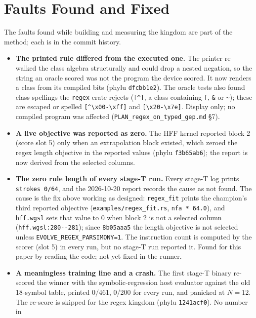 \documentclass[sigconf,nonacm]{acmart}
\newcommand{\rx}{\lstinline[style=mono]}
\newcommand{\src}[1]{{\small\nolinkurl{#1}}}
\begin{document}
\section{Faults Found and Fixed}
\label{sec:faults}

The faults found while building and measuring the kingdom are part of the
method; each is in the commit history.

\begin{itemize}
\item \textbf{The printed rule differed from the executed one.} The printer
re-walked the class algebra structurally and could drop a nested negation, so the
string an oracle scored was not the program the device scored. It now renders a
class from its compiled bits (phylu \texttt{dfcbb1e2}). The oracle tests also
found class spellings the \texttt{regex} crate rejects (\rx![^]!, a class
containing \rx![!, \rx!&! or \rx!~!); these are escaped or spelled
\rx![^\x00-\xff]! and \rx![\x20-\x7e]!. Display only; no compiled program was
affected (\src{PLAN_regex_on_typed_gep.md} \S7).
\item \textbf{A live objective was reported as zero.} The HFF kernel reported
block 2 (score slot 5) only when an extrapolation block existed, which zeroed the
regex length objective in the reported values (phylu \texttt{f3b65ab6}); the
report is now derived from the selected columns.
\item \textbf{The zero rule length of every stage-T run.} Every stage-T log prints
\texttt{strokes 0/64}, and the 2026-10-20 report records the cause as not found.
The cause is the fix above working as designed: \src{regex_fit} prints the
champion's third reported objective (\src{examples/regex_fit.rs},
\texttt{nfa * 64.0}), and \texttt{hff.wgsl} sets that value to 0 when block 2 is
not a selected column (\src{hff.wgsl:280--281}); since \texttt{8b05aaa5} the
length objective is not selected unless \src{EVOLVE_REGEX_PARSIMONY=1}. The
instruction count is computed by the scorer (slot 5) in every run, but no stage-T
run reported it. Found for this paper by reading the code; not yet fixed in the
runner.
\item \textbf{A meaningless training line and a crash.} The first stage-T binary
re-scored the winner with the symbolic-regression host evaluator against the old
18-symbol table, printed 0/461, 0/200 for every run, and panicked at $N=12$. The
re-score is skipped for the regex kingdom (phylu \texttt{1241acf0}). No number in

\end{itemize}
\end{document}
